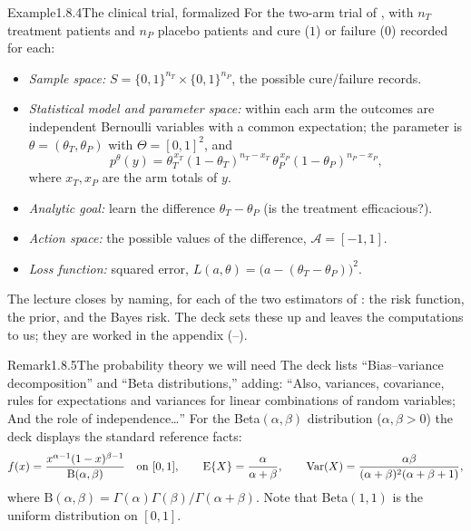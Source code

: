 \documentclass[main.tex]{subfiles}
\begin{document}
\begin{ObjL}{Example}{1.8.4}{The clinical trial, formalized}
For the two-arm trial of , with $n_T$ treatment patients and $n_P$ placebo
patients and cure ($1$) or failure ($0$) recorded for each:
\begin{itemize}[leftmargin=1.8em,itemsep=2pt,topsep=2pt]
  \item \emph{Sample space:} $S=\{0,1\}^{n_T}\times\{0,1\}^{n_P}$, the possible cure/failure
        records.
  \item \emph{Statistical model and parameter space:} within each arm the outcomes are
        independent Bernoulli variables with a common expectation; the parameter is
        $\theta=(\theta_T,\theta_P)$ with $\Theta=[0,1]^2$, and
        \[ p^{\theta}(y)=\theta_T^{\,x_T}(1-\theta_T)^{n_T-x_T}\,
                       \theta_P^{\,x_P}(1-\theta_P)^{n_P-x_P}, \]
        where $x_T,x_P$ are the arm totals of $y$.
  \item \emph{Analytic goal:} learn the difference $\theta_T-\theta_P$ (is the treatment
        efficacious?).
  \item \emph{Action space:} the possible values of the difference, $\mathcal{A}=[-1,1]$.
  \item \emph{Loss function:} squared error, $L(a,\theta)=\big(a-(\theta_T-\theta_P)\big)^2$.
\end{itemize}
The lecture closes by naming, for each of the two estimators of : the risk
function, the prior, and the Bayes risk. The deck sets these up and leaves the computations to
us; they are worked in the appendix (--).
\end{ObjL}

\begin{ObjL}{Remark}{1.8.5}{The probability theory we will need}
The deck lists ``Bias--variance decomposition'' and ``Beta distributions,'' adding: ``Also,
variances, covariance, rules for expectations and variances for linear combinations of random
variables; And the role of independence\dots'' For the Beta$(\alpha,\beta)$ distribution
($\alpha,\beta>0$) the deck displays the standard
reference facts:
\[ f(x)=\frac{x^{\alpha-1}(1-x)^{\beta-1}}{\mathrm{B}(\alpha,\beta)}
   \quad\text{on } [0,1], \qquad
   \mathrm{E}\{X\}=\frac{\alpha}{\alpha+\beta}, \qquad
   \operatorname{Var}(X)=\frac{\alpha\beta}{(\alpha+\beta)^2(\alpha+\beta+1)} , \]
where $\mathrm{B}(\alpha,\beta)=\Gamma(\alpha)\Gamma(\beta)/\Gamma(\alpha+\beta)$. Note that
Beta$(1,1)$ is the uniform distribution on $[0,1]$.
\end{ObjL}
\end{document}
